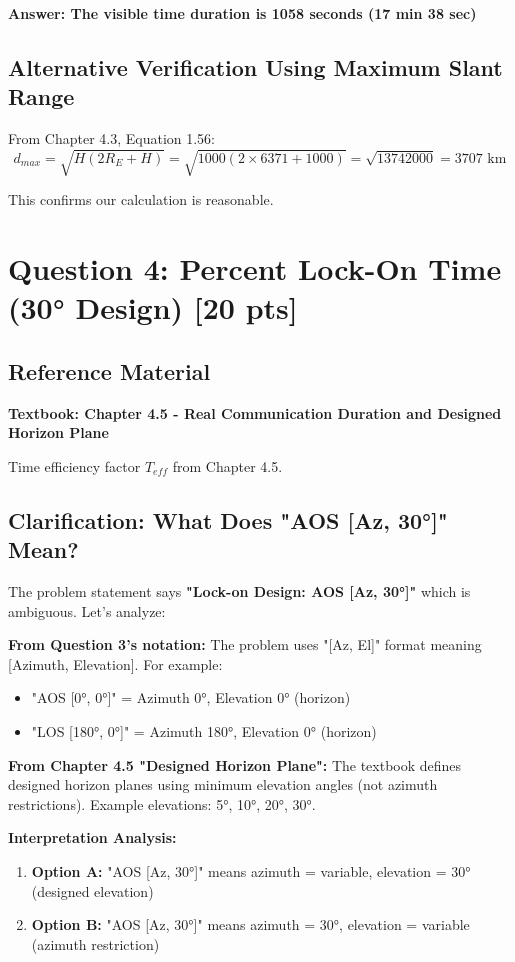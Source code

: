 \documentclass[11pt,letterpaper]{article}
\begin{document}
\textbf{Answer: The visible time duration is 1058 seconds (17 min 38 sec)}

\subsection{Alternative Verification Using Maximum Slant Range}
From Chapter 4.3, Equation 1.56:
\begin{equation}
d_{max} = \sqrt{H(2R_E + H)} = \sqrt{1000(2 \times 6371 + 1000)} = \sqrt{13742000} = 3707 \text{ km}
\end{equation}

This confirms our calculation is reasonable.

\section{Question 4: Percent Lock-On Time (30° Design) [20 pts]}

\subsection{Reference Material}
\textbf{Textbook: Chapter 4.5 - Real Communication Duration and Designed Horizon Plane}

Time efficiency factor $T_{eff}$ from Chapter 4.5.

\subsection{Clarification: What Does "AOS [Az, 30°]" Mean?}

The problem statement says \textbf{"Lock-on Design: AOS [Az, 30°]"} which is ambiguous. Let's analyze:

\textbf{From Question 3's notation:} The problem uses "[Az, El]" format meaning [Azimuth, Elevation]. For example:
\begin{itemize}
    \item "AOS [0°, 0°]" = Azimuth 0°, Elevation 0° (horizon)
    \item "LOS [180°, 0°]" = Azimuth 180°, Elevation 0° (horizon)
\end{itemize}

\textbf{From Chapter 4.5 "Designed Horizon Plane":} The textbook defines designed horizon planes using minimum elevation angles (not azimuth restrictions). Example elevations: 5°, 10°, 20°, 30°.

\textbf{Interpretation Analysis:}
\begin{enumerate}
    \item \textbf{Option A:} "AOS [Az, 30°]" means azimuth = variable, elevation = 30° (designed elevation)
    \item \textbf{Option B:} "AOS [Az, 30°]" means azimuth = 30°, elevation = variable (azimuth restriction)
\end{enumerate}
\end{document}
